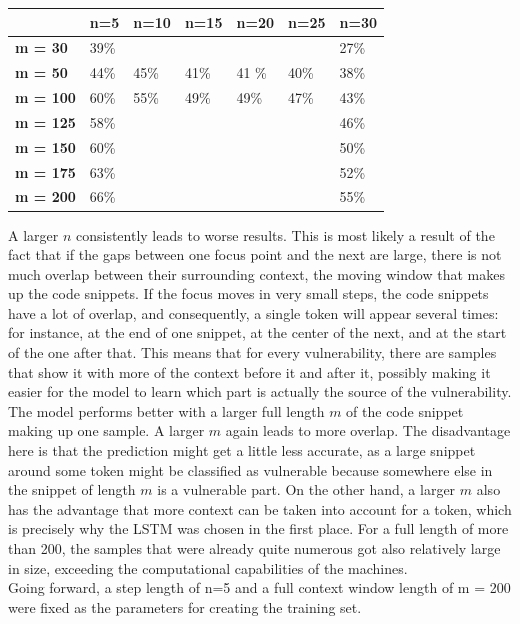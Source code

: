\documentclass[
a4paper,
pagesize,
pdftex,
12pt,
twoside, %
BCOR=5mm, %
ngerman,
fleqn,
final,
]{scrartcl}
\begin{document}
	\begin{tabular}{|p{2cm}||p{1.7cm}|p{1.7cm}|p{1.7cm}|p{1.7cm}|p{1.7cm}|p{1.7cm}|}
		\hline
		& \textbf{n=5} &\textbf{n=10} & \textbf{n=15} & \textbf{n=20} & \textbf{n=25} & \textbf{n=30} \\
		\hline
		\textbf{m = 30} & 39\% &  &  & &  & 27\% \\ 
		\textbf{m = 50} & 44\% & 45\% &41\% &41 \%& 40\% & 38\% \\ 
		\textbf{m = 100} & 60\% & 55\% &49\% &49\%&  47\% &43\% \\
		\textbf{m = 125} & 58\% &  &  & &  & 46\% \\
		\textbf{m = 150} & 60\% &  &  & &  & 50\% \\
		\textbf{m = 175} & 63\% &  &  & &  & 52\% \\
		\textbf{m = 200} & 66\% &  &  & &  & 55\% \\
		\hline
		\hline
	\end{tabular}
	
	A larger $n$ consistently leads to worse results. This is most likely a result of the fact that if the gaps between one focus point and the next are large, there is not much overlap between their surrounding context, the moving window that makes up the code snippets. If the focus moves in very small steps, the code snippets have a lot of overlap, and consequently, a single token will appear several times: for instance, at the end of one snippet, at the center of the next, and at the start of the one after that. This means that for every vulnerability, there are samples that show it with more of the context before it and after it, possibly making it easier for the model to learn which part is actually the source of the vulnerability.\\
	The model performs better with a larger full length $m$ of the code snippet making up one sample. A larger $m$ again leads to more overlap. The disadvantage here is that the prediction might get a little less accurate, as a large snippet around some token might be classified as vulnerable because somewhere else in the snippet of length $m$ is a vulnerable part. On the other hand, a larger $m$ also has the advantage that more context can be taken into account for a token, which is precisely why the LSTM was chosen in the first place. For a full length of more than 200, the samples that were already quite numerous got also relatively large in size, exceeding the computational capabilities of the machines. \\
	Going forward, a step length of n=5 and a full context window length of m = 200 were fixed as the parameters for creating the training set.
	
\end{document}
